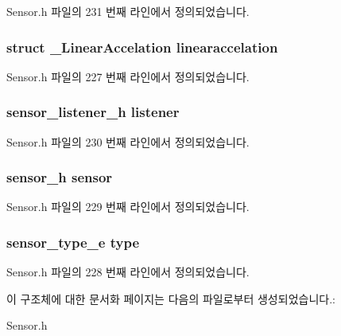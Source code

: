 Sensor.\-h 파일의 231 번째 라인에서 정의되었습니다.

\hypertarget{struct__LinearAccelationExtend_a12d1cee667dc4d73c2096e6e7b9951bf}{
\subsubsection[{linearaccelation}]{\setlength{\rightskip}{0pt plus 5cm}struct {\bf \-\_\-\-Linear\-Accelation} linearaccelation}}\label{struct__LinearAccelationExtend_a12d1cee667dc4d73c2096e6e7b9951bf}


Sensor.\-h 파일의 227 번째 라인에서 정의되었습니다.

\hypertarget{struct__LinearAccelationExtend_aa977dfb866b24fd7d9a20a9a01b2fd1f}{
\subsubsection[{listener}]{\setlength{\rightskip}{0pt plus 5cm}sensor\-\_\-listener\-\_\-h listener}}\label{struct__LinearAccelationExtend_aa977dfb866b24fd7d9a20a9a01b2fd1f}


Sensor.\-h 파일의 230 번째 라인에서 정의되었습니다.

\hypertarget{struct__LinearAccelationExtend_a5bae9b7801bc3808411925cde81d3f26}{
\subsubsection[{sensor}]{\setlength{\rightskip}{0pt plus 5cm}sensor\-\_\-h sensor}}\label{struct__LinearAccelationExtend_a5bae9b7801bc3808411925cde81d3f26}


Sensor.\-h 파일의 229 번째 라인에서 정의되었습니다.

\hypertarget{struct__LinearAccelationExtend_abffb09766da2fc510a79bb51f82a36e1}{
\subsubsection[{type}]{\setlength{\rightskip}{0pt plus 5cm}sensor\-\_\-type\-\_\-e type}}\label{struct__LinearAccelationExtend_abffb09766da2fc510a79bb51f82a36e1}


Sensor.\-h 파일의 228 번째 라인에서 정의되었습니다.



이 구조체에 대한 문서화 페이지는 다음의 파일로부터 생성되었습니다.\-:\begin{DoxyCompactItemize}
\item 
Sensor.\-h\end{DoxyCompactItemize}
